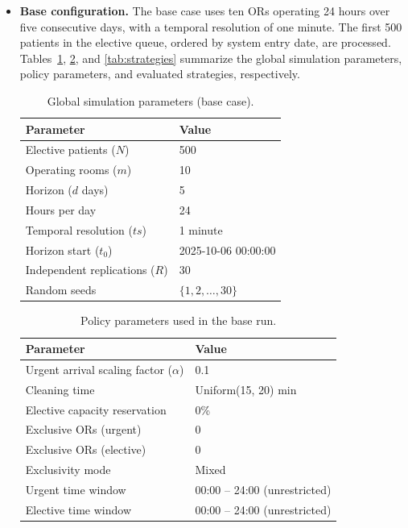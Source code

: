 \documentclass[sn-mathphys-num]{sn-jnl}
\begin{document}
\begin{itemize}

  \item \textbf{Base configuration.}
  The base case uses ten ORs operating 24 hours over five consecutive
  days, with a temporal resolution of one minute. The first 500 patients
  in the elective queue, ordered by system entry date, are processed.
  Tables~\ref{tab:params_sim}, \ref{tab:params_policy}, and
  \ref{tab:strategies} summarize the global simulation parameters,
  policy parameters, and evaluated strategies, respectively.

  \begin{table}[ht]
  \centering
  \caption{Global simulation parameters (base case).}
  \label{tab:params_sim}
  \begin{tabular}{ll}
  \toprule
  Parameter & Value \\
  \midrule
  Elective patients ($N$) & 500 \\
  Operating rooms ($m$) & 10 \\
  Horizon ($d$ days) & 5 \\
  Hours per day & 24 \\
  Temporal resolution ($ts$) & 1 minute \\
  Horizon start ($t_0$) & 2025-10-06 00:00:00 \\
  Independent replications ($R$) & 30 \\
  Random seeds & $\{1, 2, \ldots, 30\}$ \\
  \bottomrule
  \end{tabular}
  \end{table}

  \begin{table}[ht]
  \centering
  \caption{Policy parameters used in the base run.}
  \label{tab:params_policy}
  \begin{tabular}{ll}
  \toprule
  Parameter & Value \\
  \midrule
  Urgent arrival scaling factor ($\alpha$) & 0.1 \\
  Cleaning time & Uniform(15, 20) min \\
  Elective capacity reservation & 0\% \\
  Exclusive ORs (urgent) & 0 \\
  Exclusive ORs (elective) & 0 \\
  Exclusivity mode & Mixed \\
  Urgent time window & 00:00 -- 24:00 (unrestricted) \\
  Elective time window & 00:00 -- 24:00 (unrestricted) \\
  \bottomrule
  \end{tabular}
  \end{table}


\end{itemize}
\end{document}
